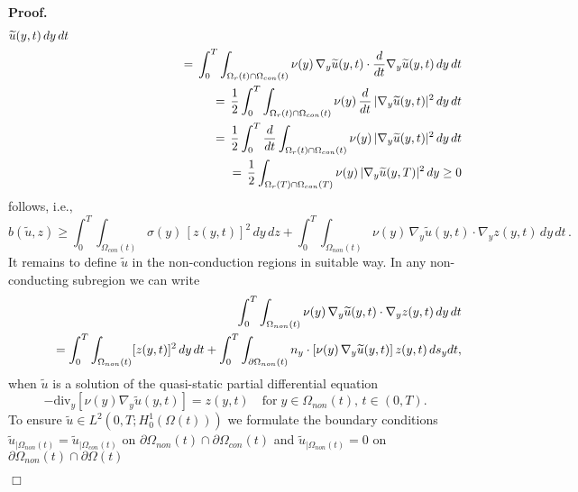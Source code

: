 \documentclass[12pt]{article}
\newenvironment{proof}{\textbf{Proof.}}{\hfill $\Box$}
\numberwithin{equation}{section}
\begin{document}
\begin{proof}
\begin{eqnarray*}
       \widetilde{u}(y,t) \, dy \, dt \\
    && \hspace*{3cm}
       = \,  \int_0^T \int_{\Omega_r(t) \cap\Omega_{con}(t)} \nu(y) \,
       \nabla_y \widetilde{u}(y,t) \cdot \frac{d}{dt}\nabla_y 
       \widetilde{u}(y,t) \, dy \, dt \\
    && \hspace*{3cm}
       = \, \frac{1}{2} \int_0^T \int_{\Omega_r(t) \cap\Omega_{con}(t)}
       \nu(y) \, \frac{d}{dt} \,
       |\nabla_y \widetilde{u}(y,t)|^2
       \, dy \, dt  \\
    && \hspace*{3cm} = \,
       \frac{1}{2} \int_0^T \frac{d}{dt} \int_{\Omega_r(t) \cap\Omega_{con}(t)}
       \nu(y) \, |\nabla_y
       \widetilde{u}(y,t)|^2
       \, dy \, dt \\
    && \hspace*{3cm} = \, \frac{1}{2} \int_{\Omega_r(T) \cap\Omega_{con}(T)}
       \nu(y) \, |\nabla_y
       \widetilde{u}(y,T)|^2 \, dy
       \geq 0 
  \end{eqnarray*}
  follows, i.e.,
  \[
    b(\widetilde{u},z) \geq
    \int_0^T \int_{\Omega_{con}(t)} \sigma(y) \, [z(y,t)]^2 \, dy \, dz +
    \int_0^T \int_{\Omega_{non}(t)} \nu(y) \, \nabla_y \widetilde{u}(y,t)
    \cdot \nabla_y z(y,t) \, dy \, dt \, .
  \]
  It remains to define $\widetilde{u}$ in the non-conduction regions in
  suitable way. In any non-conducting subregion we can write
  \begin{eqnarray*}
    && \int_0^T \int_{\Omega_{non}(t)}
    \nu(y) \, \nabla_y \widetilde{u}(y,t) \cdot \nabla_y
    z(y,t) \, dy \, dt
    \\
    && \hspace*{1cm} =
    \int_0^T \int_{\Omega_{non}(t)} [z(y,t)]^2 \, d y \, dt
    +
    \int_0^T \int_{\partial \Omega_{non}(t)} n_y \cdot [
    \nu(y) \,
    \nabla_y \widetilde{u}(y,t) ] \, z(y,t) \, ds_y dt,
  \end{eqnarray*}
  when $\widetilde{u}$ is a solution of the quasi-static partial
  differential equation
  \[
    - \mbox{div}_y [\nu(y) \nabla_y \widetilde{u}(y,t)] =
    z(y,t) \quad \mbox{for} \; y \in \Omega_{non}(t), \, t \in (0,T).
  \]
  To ensure $\widetilde{u} \in L^2(0,T;H^1_0(\Omega(t)))$ we formulate
  the boundary conditions
  $\widetilde{u}_{|\Omega_{non}(t)} = \widetilde{u}_{|\Omega_{con}(t)}$ 
  on $\partial \Omega_{non}(t) \cap \partial \Omega_{con}(t)$ and
  $\widetilde{u}_{|\Omega_{non}(t)} = 0$ 
  on $\partial \Omega_{non}(t) \cap \partial \Omega(t)$

\end{proof}
\end{document}
